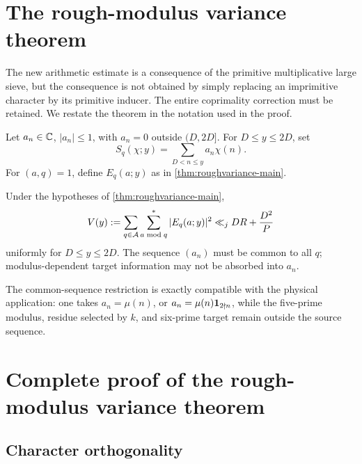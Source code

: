 \section{The rough-modulus variance theorem}\label{sec:roughstatement}

The new arithmetic estimate is a consequence of the primitive multiplicative
large sieve, but the consequence is not obtained by simply replacing an
imprimitive character by its primitive inducer.  The entire coprimality
correction must be retained.  We restate the theorem in the notation used in
the proof.

Let $a_n\in\mathbb C$, $|a_n|\le1$, with $a_n=0$ outside $(D,2D]$.  For
$D\le y\le2D$, set
\[
 S_q(\chi;y)=\sum_{D<n\le y}a_n\chi(n).
\]
For $(a,q)=1$, define $E_q(a;y)$ as in
\cref{thm:roughvariance-main}.

\begin{theorem}\label{thm:roughvariance}
Under the hypotheses of \cref{thm:roughvariance-main},
\begin{equation}\label{eq:roughvariance}
 V(y):=\sum_{q\in\mathcal A}\sum_{a\bmod q}^{*}|E_q(a;y)|^2
       \ll_j DR+\frac{D^2}{P}
\end{equation}
uniformly for $D\le y\le2D$.  The sequence $(a_n)$ must be common to all
$q$; modulus-dependent target information may not be absorbed into $a_n$.
\end{theorem}

The common-sequence restriction is exactly compatible with the physical
application: one takes $a_n=\mu(n)$, or $a_n=\mu(n)\mathbf 1_{2\nmid n}$, while the
five-prime modulus, residue selected by $k$, and six-prime target remain outside
the source sequence.

\section{Complete proof of the rough-modulus variance theorem}\label{sec:roughproof}

\subsection{Character orthogonality}

